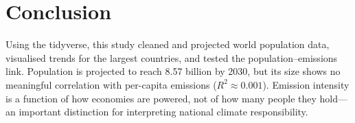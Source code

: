 \documentclass[11pt]{article}
\begin{document}
\section{Conclusion}
Using the tidyverse, this study cleaned and projected world population data,
visualised trends for the largest countries, and tested the population--emissions
link. Population is projected to reach 8.57 billion by 2030, but its size shows no
meaningful correlation with per-capita emissions ($R^2 \approx 0.001$). Emission
intensity is a function of how economies are powered, not of how many people they
hold---an important distinction for interpreting national climate responsibility.
\end{document}
